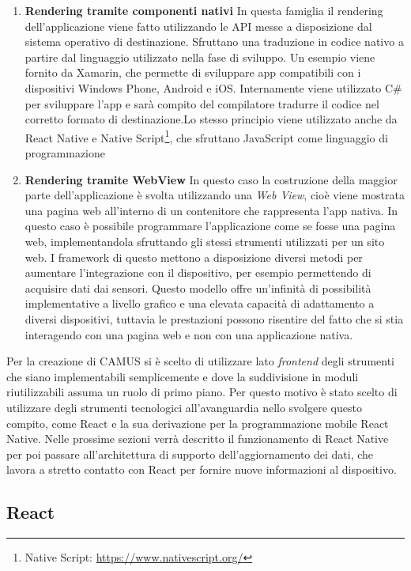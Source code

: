 \begin{enumerate}
	\item \textbf{Rendering tramite componenti nativi} In questa famiglia il rendering dell'applicazione viene fatto utilizzando le API messe a disposizione dal sistema operativo di destinazione.
	Sfruttano una traduzione in codice nativo a partire dal linguaggio utilizzato nella fase di sviluppo. Un esempio viene fornito da Xamarin, che permette di sviluppare app compatibili con i dispositivi Windows Phone, Android e iOS. Internamente viene utilizzato C\# per sviluppare l’app e sarà compito del compilatore tradurre il codice nel corretto formato di destinazione.Lo stesso principio viene utilizzato anche da React Native e Native Script\footnote{Native Script: \url{https://www.nativescript.org/}}, che sfruttano JavaScript come linguaggio di programmazione
	\item \textbf{Rendering tramite WebView} In questo caso la costruzione della maggior parte dell'applicazione è svolta utilizzando una \emph{Web View}, cioè viene mostrata una pagina web all'interno di un contenitore che rappresenta l'app nativa.
	In questo caso è possibile programmare l'applicazione come se fosse una pagina web, implementandola sfruttando gli stessi strumenti utilizzati per un sito web. I framework di questo mettono a disposizione diversi metodi per aumentare l’integrazione con il dispositivo, per esempio permettendo di acquisire dati dai sensori.
	Questo modello offre un'infinità di possibilità implementative a livello grafico e una elevata capacità di adattamento a diversi dispositivi, tuttavia le prestazioni possono risentire del fatto che si stia interagendo con una pagina web e non con una applicazione nativa.
\end{enumerate}

Per la creazione di CAMUS si è scelto di utilizzare lato \emph{frontend} degli strumenti che siano implementabili semplicemente e dove la suddivisione in moduli riutilizzabili assuma un ruolo di primo piano. Per questo motivo è stato scelto di utilizzare degli strumenti tecnologici all'avanguardia nello svolgere questo compito, come React e la sua derivazione per la programmazione mobile React Native. Nelle prossime sezioni verrà descritto il funzionamento di React Native per poi passare all’architettura di supporto dell’aggiornamento dei dati, che lavora a stretto contatto con React per fornire nuove informazioni al dispositivo.

\subsection{React}\label{sec:react}

